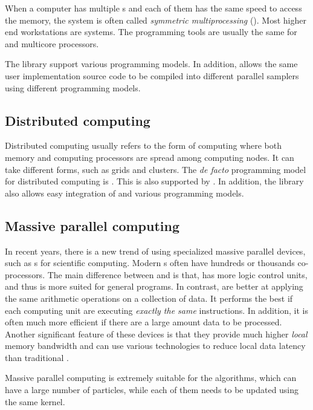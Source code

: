When a computer has multiple \cpu{}s and each of them has the same speed to
access the memory, the system is often called \emph{symmetric multiprocessing}
(\smp). Most higher end workstations are \smp systems. The programming tools
are usually the same for \smp and multicore processors.

The \vsmc library support various \smp programming models. In addition, \vsmc
allows the same user implementation source code to be compiled into different
parallel samplers using different programming models.

\subsection{Distributed computing}
\label{sub:Distributed computing}

Distributed computing usually refers to the form of computing where both
memory and computing processors are spread among computing nodes. It can take
different forms, such as grids and clusters. The \emph{de facto} programming
model for distributed computing is \mpi. This is also supported by \vsmc. In
addition, the library also allows easy integration of \mpi and various \smp
programming models.

\subsection{Massive parallel computing}
\label{sub:Massive parallel computing}

In recent years, there is a new trend of using specialized massive parallel
devices, such as \gpu{}s for scientific computing. Modern \gpu{}s often have
hundreds or thousands co-processors. The main difference between \gpu and \cpu
is that, \cpu has more logic control units, and thus is more suited for
general programs. In contrast, \gpu are better at applying the same arithmetic
operations on a collection of data. It performs the best if each computing
unit are executing \emph{exactly the same} instructions. In addition, it is
often much more efficient if there are a large amount data to be processed.
Another significant feature of these devices is that they provide much higher
\emph{local} memory bandwidth and can use various technologies to reduce local
data latency than traditional \cpu.

Massive parallel computing is extremely suitable for the \smc algorithms,
which can have a large number of particles, while each of them needs to be
updated using the same \mcmc kernel.

